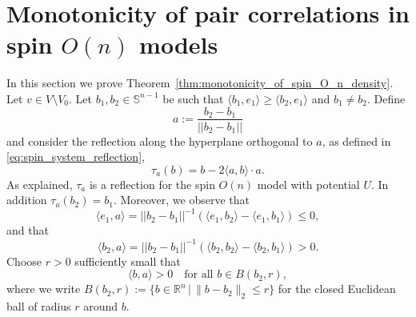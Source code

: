 \documentclass[english]{article}
\theoremstyle{plain}
\theoremstyle{plain}
\begin{document}
\section{Monotonicity of pair correlations in spin $O(n)$ models}\label{sec:monotonicity_of_pair_correlations}
In this section we prove Theorem~\ref{thm:monotonicity_of_spin_O_n_density}. Let $v\in V\setminus V_0$. Let $b_1,b_2\in \mathbb{S}^{n-1}$ be such that $\langle b_1,e_1\rangle \geq\langle b_2, e_1\rangle$ and $b_1\neq  b_2$.   Define
\[
a := \frac{b_2-b_1}{||b_2-b_1||}
\]
 and consider the reflection along the hyperplane orthogonal to $a$, as defined in \eqref{eq:spin_system_reflection},
\[
\tau_a(b)=b-2\langle a,b\rangle\cdot a.
\]
As explained, $\tau_a$ is a reflection for the spin $O(n)$ model with potential $U$. In addition $\tau_a(b_2) = b_1$.
Moreover, we observe that
\begin{equation}\label{one_side}
\langle  e_1,a\rangle = ||b_2-b_1||^{-1}(\langle e_1,  b_2\rangle - \langle e_1,  b_1\rangle)\le 0,
\end{equation}
and that
\begin{equation*}
\langle b_2,a\rangle =||b_2-b_1||^{-1}(\langle b_2,b_2\rangle - \langle b_2,b_1\rangle)> 0.
\end{equation*}
Choose $r>0$ sufficiently small that
\begin{equation}\label{other_side}
\langle b, a\rangle > 0\quad\text{for all } b\in B(b_2,r),
\end{equation}
where we write $B(b_2, r):=\{b\in\mathbb{R}^n\,|\,\|b-b_2\|_2\le r\}$ for the closed Euclidean ball of radius $r$ around $b$.
\end{document}
